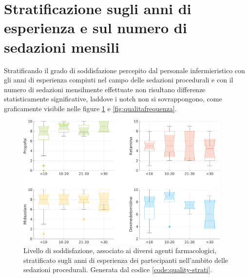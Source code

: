 \newpage

\section{Stratificazione sugli anni di esperienza e sul numero di sedazioni mensili}

Stratificando il grado di soddisfazione percepito dal personale infermieristico con gli anni di esperienza compiuti nel campo delle sedazioni procedurali e con il numero di sedazioni mensilmente effettuate non risultano differenze statisticamente significative, laddove i notch non si sovrappongono, come graficamente visibile nelle figure \ref{fig:qualitaesperienza} e \ref {fig:qualitafrequenza}.

\vfill

\begin{figure}[!ht]
    \centering
    \includegraphics[width=0.95\textwidth]{Figure/qualita-strat-esperienza.png}
    \caption{Livello di soddisfazione, associato ai diversi agenti farmacologici, stratificato sugli anni di esperienza dei partecipanti nell'ambito delle sedazioni procedurali. Generata dal codice \ref{code:quality-strati}.}
    \label{fig:qualitaesperienza}
\end{figure}

